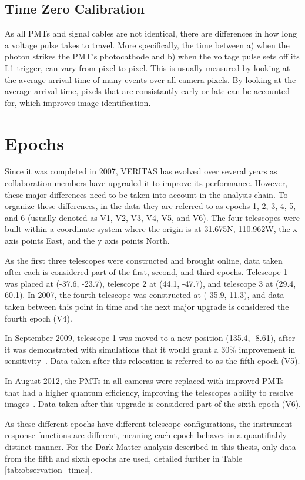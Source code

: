 \subsection{Time Zero Calibration}
As all PMTs and signal cables are not identical, there are differences in how long a voltage pulse takes to travel.
More specifically, the time between a) when the photon strikes the PMT's photocathode and b) when the voltage pulse sets off its L1 trigger, can vary from pixel to pixel.
This is usually measured by looking at the average arrival time of many events over all camera pixels.
By looking at the average arrival time, pixels that are consistantly early or late can be accounted for, which improves image identification.

\section{Epochs}\label{sec:epochs}
Since it was completed in 2007, VERITAS has evolved over several years as collaboration members have upgraded it to improve its performance.
However, these major differences need to be taken into account in the analysis chain.
To organize these differences, in the data they are referred to as epochs 1, 2, 3, 4, 5, and 6 (usually denoted as V1, V2, V3, V4, V5, and V6).
The four telescopes were built within a coordinate system where the origin is at 31.675N, 110.962W, the x axis points East, and the y axis points North.

As the first three telescopes were constructed and brought online, data taken after each is considered part of the first, second, and third epochs.
Telescope 1 was placed at (-37.6, -23.7), telescope 2 at (44.1, -47.7), and telescope 3 at (29.4, 60.1).
In 2007, the fourth telescope was constructed at (-35.9, 11.3), and data taken between this point in time and the next major upgrade is considered the fourth epoch (V4).

In September 2009, telescope 1 was moved to a new position (135.4, -8.61), after it was demonstrated with simulations that it would grant a \nicetilde{}30\% improvement in sensitivity~\cite{veritas_t1_move}.
Data taken after this relocation is referred to as the fifth epoch (V5).

In August 2012, the PMTs in all cameras were replaced with improved PMTs that had a higher quantum efficiency, improving the telescopes ability to resolve images~\cite{pmtmodels}.
Data taken after this upgrade is considered part of the sixth epoch (V6).

As these different epochs have different telescope configurations, the instrument response functions are different, meaning each epoch behaves in a quantifiably distinct manner.
For the Dark Matter analysis described in this thesis, only data from the fifth and sixth epochs are used, detailed further in Table \ref{tab:observation_times}.


